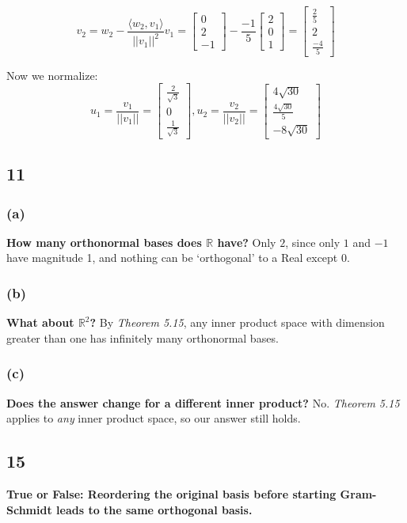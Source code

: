 \documentclass[10pt,letterpaper]{article}
\begin{document}
	$$
	v_2 = w_2 - \frac{\langle w_2, v_1 \rangle}{||v_1||^2} v_1 = \begin{bmatrix}
	0  \\ 2 \\ -1 
	\end{bmatrix} - \frac{-1}{5} \begin{bmatrix}
	2 \\ 0 \\1
	\end{bmatrix} = \begin{bmatrix}
	\frac{2}{5} \\ 2 \\ \frac{-4}{5}
	\end{bmatrix}
	$$
	
	Now we normalize:
	$$
	\boxed{u_1 = \frac{v_1}{||v_1||} = \begin{bmatrix}
	\frac{2}{\sqrt{3}} \\ 0 \\ \frac{1}{\sqrt{3}}
	\end{bmatrix}, u_2 = \frac{v_2}{||v_2||} = \begin{bmatrix}
	4 \sqrt{30} \\ \frac{4 \sqrt{30}}{5} \\ -8 \sqrt{30}
	\end{bmatrix}}
	$$
	\subsection*{11} 
	\subsubsection*{(a)} \textbf{How many orthonormal bases does $\mathbb{R}$ have?} 
	Only $2$, since only $1$ and $-1$ have magnitude 1, and nothing can be `orthogonal' to a Real except 0.   
	\subsubsection*{(b)} \textbf{What about $\mathbb{R}^2$?}
	By \textit{Theorem 5.15}, any inner product space with dimension greater than one has infinitely many orthonormal bases. 
	\subsubsection*{(c)} \textbf{Does the answer change for a different inner product?}
	No.  \textit{Theorem 5.15} applies to \textit{any} inner product space, so our answer still holds. 
	\subsection*{15} \textbf{True or False: Reordering the original basis before starting Gram-Schmidt leads to the same orthogonal basis. }
	
\end{document}

